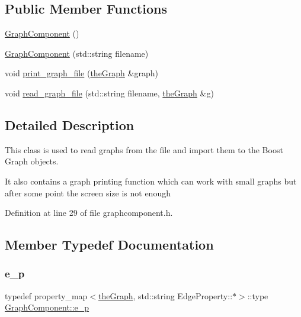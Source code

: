 \subsection*{Public Member Functions}
\begin{DoxyCompactItemize}
\item 
\hyperlink{class_graph_component_a35c4a6e5c6f28751b1bd6c451cc07957}{Graph\+Component} ()
\item 
\hyperlink{class_graph_component_a14482fdab4e309677b4a14ab8db13079}{Graph\+Component} (std\+::string filename)
\item 
void \hyperlink{class_graph_component_a6af293dac3774fde0e2822b5725ecacd}{print\+\_\+graph\+\_\+file} (\hyperlink{class_graph_component_a982e0748a6e1b8dc74986f5f8b3dca5c}{the\+Graph} \&graph)
\item 
void \hyperlink{class_graph_component_a680363eab8b992d739f055bd484bc000}{read\+\_\+graph\+\_\+file} (std\+::string filename, \hyperlink{class_graph_component_a982e0748a6e1b8dc74986f5f8b3dca5c}{the\+Graph} \&g)
\end{DoxyCompactItemize}


\subsection{Detailed Description}
This class is used to read graphs from the file and import them to the Boost Graph objects. 

It also contains a graph printing function which can work with small graphs but after some point the screen size is not enough 

Definition at line 29 of file graphcomponent.\+h.



\subsection{Member Typedef Documentation}
\mbox{\label{class_graph_component_a22292bf7520fb476958c508d66f5d318}} 
\subsubsection{\texorpdfstring{e\+\_\+p}{e\_p}}
{\footnotesize\ttfamily typedef property\+\_\+map$<$\hyperlink{class_graph_component_a982e0748a6e1b8dc74986f5f8b3dca5c}{the\+Graph}, std\+::string Edge\+Property\+::$\ast$$>$\+::type \hyperlink{class_graph_component_a22292bf7520fb476958c508d66f5d318}{Graph\+Component\+::e\+\_\+p}}



